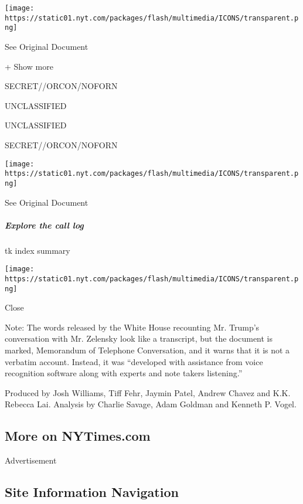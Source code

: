 \protect\hyperlink{}{}

\texttt{[image: https://static01.nyt.com/packages/flash/multimedia/ICONS/transparent.png]}

See Original Document

+ Show more

SECRET//ORCON/NOFORN

UNCLASSIFIED

UNCLASSIFIED

SECRET//ORCON/NOFORN

\protect\hyperlink{}{}

\texttt{[image: https://static01.nyt.com/packages/flash/multimedia/ICONS/transparent.png]}

See Original Document

\hypertarget{explore-the-call-log}{%
\subparagraph{Explore the call log}\label{explore-the-call-log}}

tk index summary

\texttt{[image: https://static01.nyt.com/packages/flash/multimedia/ICONS/transparent.png]}

Close

Note: The words released by the White House recounting Mr. Trump's
conversation with Mr. Zelensky look like a transcript, but the document
is marked, Memorandum of Telephone Conversation, and it warns that it is
not a verbatim account. Instead, it was ``developed with assistance from
voice recognition software along with experts and note takers
listening.''

Produced by Josh Williams, Tiff Fehr, Jaymin Patel, Andrew Chavez and
K.K. Rebecca Lai. Analysis by Charlie Savage, Adam Goldman and Kenneth
P. Vogel.

\hypertarget{more-on-nytimescom}{%
\subsection{More on NYTimes.com}\label{more-on-nytimescom}}

Advertisement

\hypertarget{site-information-navigation}{%
\subsection{Site Information
Navigation}\label{site-information-navigation}}

